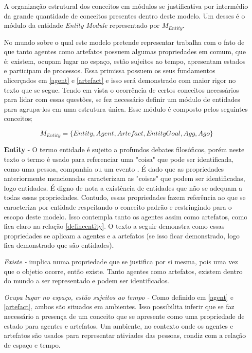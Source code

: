 A organização estrutural dos conceitos em módulos se justificativa por intermédio da grande quantidade de conceitos presentes dentro deste modelo. 
Um desses é o módulo da entidade \textit{Entity Module} representado por $M_{Entity}$. 

No mundo sobre o qual este modelo pretende representar trabalha com o fato de que tanto agentes como artefatos possuem algumas propriedades em comum, que
é; existem, ocupam lugar no espaço, estão sujeitos ao tempo, apresentam estados e participam de processos. Essa primissa possuem os 
seus fundamentos alicerçados em \ref{agent} e \ref{artefact} e isso será demonstrado com maior rigor no texto que se segue. Tendo em vista o ocorrência de
certos conceitos necessários para lidar com essas questões, se fez necessário definir um módulo de entidades para agrupa-los em uma estrutura única.
Esse módulo é composto pelos seguintes conceitos;

\begin{equation} 
M_{Entity} = \{ Entity, Agent, Artefact, EntityGoal, Agg, Ago\}
\end{equation}\label{modent}

\textbf{Entity} - O termo entidade é sujeito a profundos debates filosóficos, porém neste texto o termo é usado para referenciar uma "coisa" que pode ser identificada, como
uma pessoa, companhia ou um evento \cite{entity}. É dado que as propriedades anteriormente mencionadas caracterizam as "coisas" que podem ser identificadas, 
logo entidades. É digno de nota a existência de entidades que não se adequam a todas essas propriedades. Contudo, essas propriedades fazem referência ao 
que se caracteriza por entidade respeitando o conceito padrão \cite{entity} e restringindo para o escopo deste modelo. Isso contempla tanto os agentes 
assim como artefatos, como fica claro na relação \ref{defineentity}. O texto a seguir demonstra como essas propriedades se aplicam a agentes e a artefatos 
(se isso ficar demonstrado, logo fica demonstrado que são entidades).

\textit{Existe -} implica numa propriedade que se justifica por si mesma, pois uma vez que o objetio ocorre, então existe. Tanto agentes como artefatos, 
existem dentro do mundo a ser representado e podem ser identificados.  

\textit{Ocupa lugar no espaço, estão sujeitos ao tempo - } Como definido em \ref{agent} e \ref{artefact}, ambos são situados em ambientes. 
Isso possibilita inferir que se faz necessário a presença de um conceito que se apresente como uma propriedade de estado para agentes e artefatos. 
Um ambiente, no contexto onde os agentes e artefatos são usados para representar ativiades das pessoas, condiz com a relação de espaço e tempo. 

